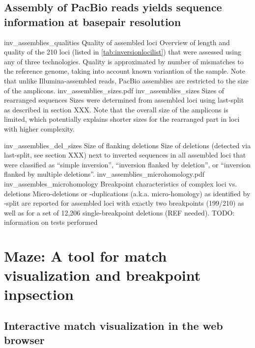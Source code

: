 \subsection{Assembly of PacBio reads yields sequence information at basepair resolution}



    {inv_assemblies_qualities}
    {Quality of assembled loci}
    {Overview of length and quality of the 210 loci (listed in
    \cref{tab:inversionlocilist}) that were assessed using
    any of three technologies. Quality is approximated by number of mismatches
    to the reference genome, taking into account known variantion of the sample.
    Note that unlike Illumina-assembled reads, PacBio assemblies are restricted
    to the size of the amplicons.}
        {inv_assemblies_sizes.pdf}
    {inv_assemblies_sizes}
    {Sizes of rearranged sequences}
    {Sizes were determined from assembled loci using \acs{last}-split as
    described in section XXX. Note that the overall size of the amplicons is
    limited, which potentially explains shorter sizes for the rearranged part in
    loci with higher complexity.}

    {inv_assemblies_del_sizes}
    {Size of flanking deletions}
    {Size of deletions (detected via \acs{last}-split, see section XXX) next to
    inverted sequences in all assembled loci that were classified as
    ``simple inversion'', ``inversion flanked by deletion'', or ``inversion
    flanked by multiple deletions''.}
        {inv_assemblies_microhomology.pdf}
    {inv_assembles_microhomology}
    {Breakpoint characteristics of complex loci vs. deletions}
    {Micro-deletions or -duplications (a.k.a. micro-homology) as identified by
    \last-split are reported for assembled loci with exactly two breakpoints
    (199/210) as well as for a set of 12,206 single-breakpoint deletions (REF needed).
    TODO: information on tests performed}

\section{Maze: A tool for match visualization and breakpoint inpsection}
\subsection{Interactive match visualization in the web browser}
\label{sec:dotplot}


